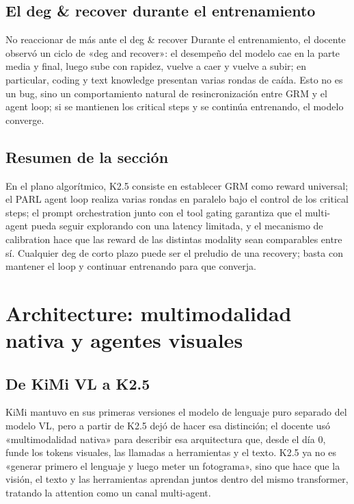 \documentclass[a4paper]{article}
\begin{document}
\subsection{El deg \& recover durante el entrenamiento}
\begin{warningbox}{No reaccionar de más ante el deg \& recover}
Durante el entrenamiento, el docente observó un ciclo de «deg and recover»: el desempeño del modelo cae en la parte media y final, luego sube con rapidez, vuelve a caer y vuelve a subir; en particular, coding y text knowledge presentan varias rondas de caída. Esto no es un bug, sino un comportamiento natural de resincronización entre GRM y el agent loop; si se mantienen los critical steps y se continúa entrenando, el modelo converge.
\end{warningbox}

\subsection{Resumen de la sección}
En el plano algorítmico, K2.5 consiste en establecer GRM como reward universal; el PARL agent loop realiza varias rondas en paralelo bajo el control de los critical steps; el prompt orchestration junto con el tool gating garantiza que el multi-agent pueda seguir explorando con una latency limitada, y el mecanismo de calibration hace que las reward de las distintas modality sean comparables entre sí. Cualquier deg de corto plazo puede ser el preludio de una recovery; basta con mantener el loop y continuar entrenando para que converja.
\section{Architecture: multimodalidad nativa y agentes visuales}

\subsection{De KiMi VL a K2.5}
KiMi mantuvo en sus primeras versiones el modelo de lenguaje puro separado del modelo VL, pero a partir de K2.5 dejó de hacer esa distinción; el docente usó «multimodalidad nativa» para describir esa arquitectura que, desde el día 0, funde los tokens visuales, las llamadas a herramientas y el texto. K2.5 ya no es «generar primero el lenguaje y luego meter un fotograma», sino que hace que la visión, el texto y las herramientas aprendan juntos dentro del mismo transformer, tratando la attention como un canal multi-agent.
\end{document}
